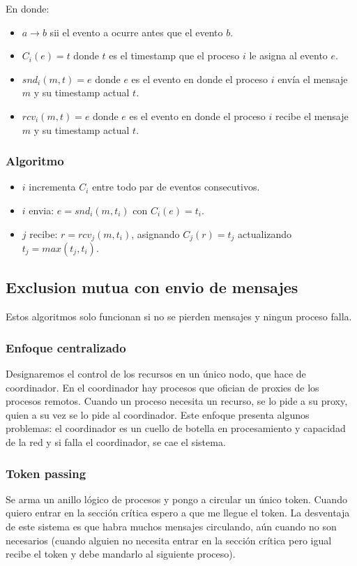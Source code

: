 \documentclass{article}
\begin{document}
En donde:

\begin{itemize}
 \item $a \rightarrow b$ sii el evento a ocurre antes que el evento $b$.
 \item $C_i(e) = t$ donde $t$ es el timestamp que el proceso $i$ le asigna al evento $e$.
 \item $snd_i(m, t) = e$ donde $e$ es el evento en donde el proceso $i$ envía el mensaje $m$ y su timestamp actual $t$.
 \item $rcv_i(m, t) = e$ donde $e$ es el evento en donde el proceso $i$ recibe el mensaje $m$ y su timestamp actual $t$.
\end{itemize}

\subsubsection{Algoritmo}
\begin{itemize}
 \item $i$ incrementa $C_i$ entre todo par de eventos consecutivos.
 \item $i$ envia: $e = snd_i(m, t_i)$ con $C_i(e) = t_i$.
 \item $j$ recibe: $r = rcv_j(m, t_i)$, asignando $C_j(r) = t_j$ actualizando $t_j = max(t_j, t_i)$.
\end{itemize}

\subsection{Exclusion mutua con envio de mensajes}

Estos algoritmos solo funcionan si no se pierden mensajes y ningun proceso falla.

\subsubsection{Enfoque centralizado}
Designaremos el control de los recursos en un único nodo, que hace de coordinador. En el coordinador hay procesos que ofician de proxies de los procesos remotos. Cuando un proceso necesita un recurso, se lo pide a su proxy, quien a su vez se lo pide al coordinador. Este enfoque presenta algunos problemas: el coordinador es un cuello de botella en procesamiento y capacidad de la red y si falla el coordinador, se cae el sistema.

\subsubsection{Token passing}
Se arma un anillo lógico de procesos y pongo a circular un único token. Cuando quiero entrar en la sección crítica espero a que me llegue el token. La desventaja de este sistema es que habra muchos mensajes circulando, aún cuando no son necesarios (cuando alguien no necesita entrar en la sección crítica pero igual recibe el token y debe mandarlo al siguiente proceso).
\end{document}
